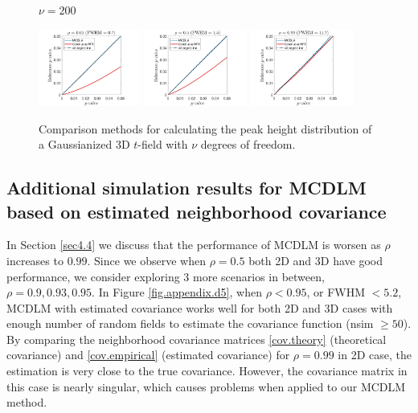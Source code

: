 \documentclass{article}
\begin{document}
\begin{figure}[!htp]
\begin{sideways}
\phantom{------------------}$\nu = 200$
\end{sideways}
\includegraphics[trim=70 5 100 5, clip,width=0.3\textwidth]{figure/3D_nu200_rho0.01_gauss.jpg}
\includegraphics[trim=70 5 100 5, clip,width=0.3\textwidth]{figure/3D_nu200_rho0.5_gauss.jpg}
\includegraphics[trim=70 5 100 5, clip,width=0.3\textwidth]{figure/3D_nu200_rho0.99_gauss.jpg}
\caption{Comparison methods for calculating the peak height distribution of a Gaussianized 3D $t$-field with $\nu$ degrees of freedom.\label{fig.t2gauss3D}}
\end{figure}

\subsection{Additional simulation results for MCDLM based on estimated neighborhood covariance \label{appendix.d5}}
In Section \ref{sec4.4} we discuss that the performance of MCDLM is worsen as $\rho$ increases to $0.99$. Since we observe when $\rho = 0.5$ both 2D and 3D have good performance, we consider exploring 3 more scenarios in between, $\rho = 0.9, 0.93, 0.95$. In Figure \ref{fig.appendix.d5}, when $\rho < 0.95$, or FWHM $<5.2$, MCDLM with estimated covariance works well for both 2D and 3D cases with enough number of random fields to estimate the covariance function (nsim $\geq 50$). By comparing the neighborhood covariance matrices \eqref{cov.theory} (theoretical covariance) and \eqref{cov.empirical} (estimated covariance) for $\rho = 0.99$ in 2D case, the estimation is very close to the true covariance. However, the covariance matrix in this case is nearly singular, which causes problems when applied to our MCDLM method.   
\end{document}
